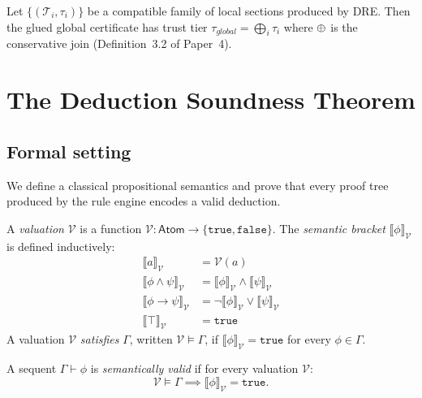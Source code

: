 \documentclass[11pt]{article}
\newcommand{\PTree}{\mathcal{T}}              %
\newcommand{\Prov}[2]{#1 \vdash #2}           %
\newcommand{\Val}{\mathcal{V}}                %
\newcommand{\Sat}{\models}                    %
\newcommand{\sem}[1]{\llbracket #1 \rrbracket}%
\begin{document}
\begin{proposition}\label{prop:trust-glue}
  Let $\{(\PTree_i, \tau_i)\}$ be a compatible family of local sections
  produced by \textsc{DRE}.  Then the glued global certificate has trust
  tier $\tau_{\mathit{global}} = \bigoplus_i \tau_i$ where $\oplus$ is
  the conservative join (Definition~3.2 of Paper~4).
\end{proposition}

\section{The Deduction Soundness Theorem}\label{sec:soundness}

\subsection{Formal setting}

We define a classical propositional semantics and prove that every
proof tree produced by the rule engine encodes a valid deduction.

\begin{definition}\label{def:valuation}
A \emph{valuation} $\Val$ is a function $\Val : \mathsf{Atom} \to
\{\mathtt{true}, \mathtt{false}\}$.  The \emph{semantic bracket}
$\sem{\phi}_\Val$ is defined inductively:
\begin{align*}
  \sem{a}_\Val &= \Val(a) \\
  \sem{\phi \wedge \psi}_\Val &= \sem{\phi}_\Val \wedge
                                  \sem{\psi}_\Val \\
  \sem{\phi \to \psi}_\Val &=
    \neg\sem{\phi}_\Val \vee \sem{\psi}_\Val \\
  \sem{\top}_\Val &= \mathtt{true}
\end{align*}
A valuation $\Val$ \emph{satisfies} $\Gamma$, written $\Val \Sat \Gamma$,
if $\sem{\phi}_\Val = \mathtt{true}$ for every $\phi \in \Gamma$.
\end{definition}

\begin{definition}\label{def:validity}
A sequent $\Prov{\Gamma}{\phi}$ is \emph{semantically valid} if
for every valuation $\Val$:
\[
  \Val \Sat \Gamma \implies \sem{\phi}_\Val = \mathtt{true}.
\]
\end{definition}
\end{document}

